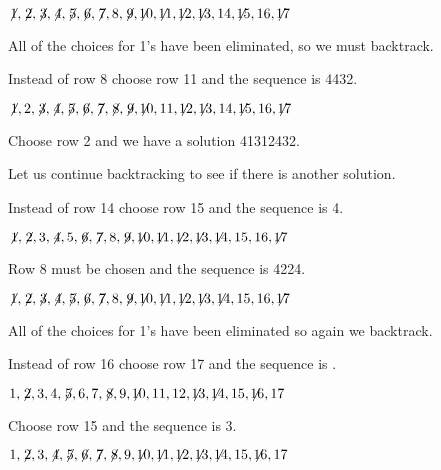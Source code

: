 $\not\! 1,\not\! 2,\not\! 3,\not\! 4,\not\! 5,\not\! 6,\not\! 7,8,\not\! 9,\not\!\! 10,\not\!\! 11,\not\!\! 12,\not\!\! 13,14, \not\!\! 15,16,\not\!\! 17$

\noindent All of the choices for 1's have been eliminated, so we must backtrack.

\smallskip

\noindent Instead of row 8 choose row 11 and the sequence is 44{}3{}2.


$\not\! 1,2,\not\! 3,\not\! 4,\not\! 5,\not\! 6,\not\! 7,\not\! 8,\not\! 9,\not\!\! 10,11,\not\!\! 12,\not\!\! 13,14, \not\!\! 15,16,\not\!\! 17$

\noindent Choose row 2 and we have a solution 4{}1{}3{}1{}2{}4{}3{}2.

\smallskip

\noindent Let us continue backtracking to see if there is another solution.

\smallskip

\noindent Instead of row 14 choose row 15 and the sequence is 4\textvisiblespace {}.

$\not\! 1,\not\! 2,3,\not\! 4,5,\not\! 6,\not\! 7,8,\not\! 9,\not\!\! 10,\not\!\! 11,\not\!\! 12,\not\!\! 13,\not\!\! 14,15,16,\not\!\! 17$

\newpage

\noindent Row 8 must be chosen and the sequence is 4{}22{}4.

$\not\! 1,\not\! 2,\not\! 3,\not\! 4,\not\! 5,\not\! 6,\not\! 7,8,\not\! 9,\not\!\! 10,\not\!\! 11,\not\!\! 12,\not\!\! 13,\not\!\! 14,15,16,\not\!\! 17$

\noindent All of the choices for 1's have been eliminated so again we backtrack.

\smallskip

\noindent Instead of row 16 choose row 17 and the sequence is \textvisiblespace \textvisiblespace \textvisiblespace{}\textvisiblespace.

$1,\not\! 2,3,4,\not\! 5,6,7,\not\! 8,9,\not\!\! 10,11,12,\not\!\! 13,\not\!\! 14,15,\not\!\! 16,17$

\noindent Choose row 15 and the sequence is \textvisiblespace{}3.

$1,\not\! 2,3,\not\! 4,\not\! 5,\not\! 6,\not\! 7,\not\! 8,9,\not\!\! 10,\not\!\! 11,\not\!\! 12,\not\!\! 13,\not\!\! 14,15,\not\!\! 16,17$

